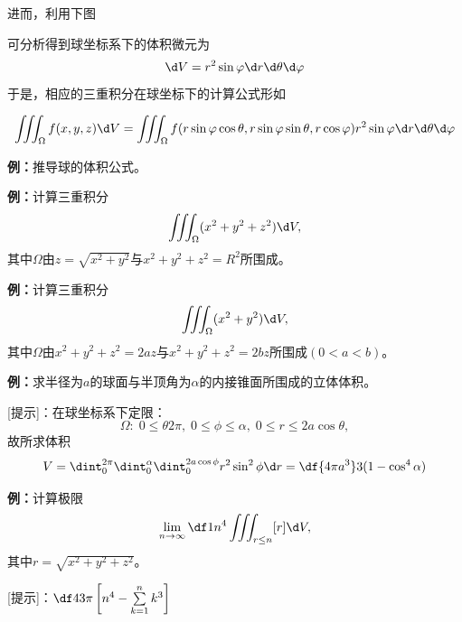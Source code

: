 进而，利用下图
\begin{center}
\end{center}
可分析得到球坐标系下的体积微元为
$$\d V=r^2\sin\varphi \d r\d\theta \d\varphi$$
于是，相应的三重积分在球坐标下的计算公式形如
\begin{thx}
	$$\iiint_{\Omega}f(x,y,z)\d
	V=\iiint_{\Omega}f(r\sin\varphi\cos\theta,r\sin\varphi\sin\theta,
	r\cos\varphi)r^2\sin\varphi \d r\d\theta \d\varphi$$
\end{thx}

{\bf 例：}推导球的体积公式。

{\bf 例：}计算三重积分
$$\iiint_{\Omega}(x^2+y^2+z^2)\d V,$$
其中$\Omega$由$z=\sqrt{x^2+y^2}$与$x^2+y^2+z^2=R^2$所围成。

{\bf 例：}计算三重积分
$$\iiint_{\Omega}(x^2+y^2)\d V,$$
其中$\Omega$由$x^2+y^2+z^2=2az$与$x^2+y^2+z^2=2bz$所围成$(0<a<b)$。

{\bf 例：}求半径为$a$的球面与半顶角为$\alpha$的内接锥面所围成的立体体积。

[提示]：在球坐标系下定限：
$$\Omega:\;0\leq\theta2\pi,\;0\leq\phi\leq\alpha,\;0\leq r\leq2a\cos\theta,$$
故所求体积
$$V=\dint_0^{2\pi}\dint_0^{\alpha}\dint_0^{2a\cos\phi}r^2\sin^2\phi\d r
=\df{4\pi a^3}3(1-\cos^4\alpha)$$

{\bf 例：}计算极限
$$\lim\limits_{n\to\infty}\df 1{n^4}\iiint_{r\leq n}[r]\d V,$$
其中$r=\sqrt{x^2+y^2+z^2}$。

[提示]：${\df 43\pi\left[n^4-\sum\limits_{k=1}^nk^3\right]}$

